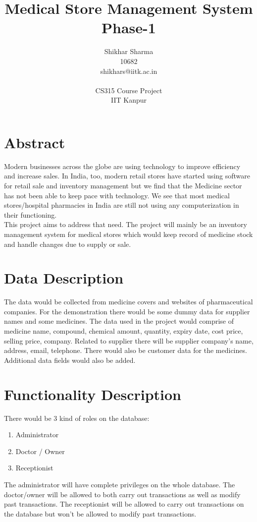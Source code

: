 \documentclass[a4papaer]{article}
\title{{\bf Medical Store Management System}\\Phase-1}
\author{Shikhar Sharma\\10682\\shikhars@iitk.ac.in\\\\CS315 Course Project\\IIT Kanpur}
\begin{document}
\maketitle
\thispagestyle{empty}
\newpage
\thispagestyle{empty}
\section*{Abstract}
Modern businesses across the globe are using technology to improve efficiency and increase sales. In India, too, modern retail stores have started using software for retail sale and inventory management but we find that the Medicine sector has not been able to keep pace with technology. We see that most medical stores/hospital pharmacies in India are still not using any computerization in their functioning.\\

This project aims to address that need. The project will mainly be an inventory management system for medical stores which would keep record of medicine stock and handle changes due to supply or sale.

\section*{Data Description}
The data would be collected from medicine covers and websites of pharmaceutical companies. For the demonstration there would be some dummy data for supplier names and some medicines. The data used in the project would comprise of medicine name, compound, chemical amount, quantity, expiry date, cost price, selling price, company. Related to supplier there will be supplier company's name, address, email, telephone. There would also be customer data for the medicines. Additional data fields would also be added.

\section*{Functionality Description}
There would be 3 kind of roles on the database:
	\begin{enumerate}
		\item Administrator
		\item Doctor / Owner
		\item Receptionist
	\end{enumerate}
The administrator will have complete privileges on the whole database. The doctor/owner will be allowed to both carry out transactions as well as modify past transactions. The receptionist will be allowed to carry out transactions on the database but won't be allowed to modify past transactions.\\
\end{document}
